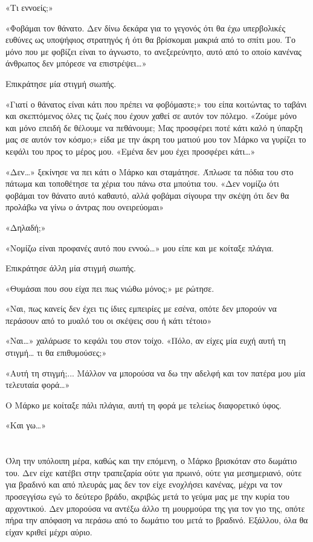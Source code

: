 \documentclass[12pt,twoside, openany]{book}
\begin{document}
«Τι εννοείς;»

«Φοβάμαι τον θάνατο. Δεν δίνω δεκάρα για το γεγονός ότι θα έχω υπερβολικές ευθύνες ως υποψήφιος στρατηγός ή ότι θα βρίσκομαι μακριά από το σπίτι μου. Το μόνο που με φοβίζει είναι το άγνωστο, το ανεξερεύνητο, αυτό από το οποίο κανένας άνθρωπος δεν μπόρεσε να επιστρέψει…»

Επικράτησε μία στιγμή σιωπής.

«Γιατί ο θάνατος είναι κάτι που πρέπει να φοβόμαστε;» του είπα κοιτώντας το ταβάνι και σκεπτόμενος όλες τις ζωές που έχουν χαθεί σε αυτόν τον πόλεμο. «Ζούμε μόνο και μόνο επειδή δε θέλουμε να πεθάνουμε; Μας προσφέρει ποτέ κάτι καλό η ύπαρξη μας σε αυτόν τον κόσμο;» είδα με την άκρη του ματιού μου τον Μάρκο να γυρίζει το κεφάλι του προς το μέρος μου. «Εμένα δεν μου έχει προσφέρει κάτι…»

«Δεν…» ξεκίνησε να πει κάτι ο Μάρκο και σταμάτησε. Άπλωσε τα πόδια του στο πάτωμα και τοποθέτησε τα χέρια του πάνω στα μπούτια του. «Δεν νομίζω ότι φοβάμαι τον θάνατο αυτό καθαυτό, αλλά φοβάμαι σίγουρα την σκέψη ότι δεν θα προλάβω να γίνω ο άντρας που ονειρεύομαι»

«Δηλαδή;»

«Νομίζω είναι προφανές αυτό που εννοώ…» μου είπε και με κοίταξε πλάγια.

Επικράτησε άλλη μία στιγμή σιωπής.

«Θυμάσαι που σου είχα πει πως νιώθω μόνος;» με ρώτησε.

«Ναι, πως κανείς δεν έχει τις ίδιες εμπειρίες με εσένα, οπότε δεν μπορούν να περάσουν από το μυαλό του οι σκέψεις σου ή κάτι τέτοιο»

«Ναι…» χαλάρωσε το κεφάλι του στον τοίχο. «Πόλο, αν είχες μία ευχή αυτή τη στιγμή… τι θα επιθυμούσες;»

«Αυτή τη στιγμή;... Μάλλον να μπορούσα να δω την αδελφή και τον πατέρα μου μία τελευταία φορά…»

Ο Μάρκο με κοίταξε πάλι πλάγια, αυτή τη φορά με τελείως διαφορετικό ύφος. 

«Και γω…»


\chapter{}

Όλη την υπόλοιπη μέρα, καθώς και την επόμενη, ο Μάρκο βρισκόταν στο δωμάτιο του. Δεν είχε κατέβει στην τραπεζαρία ούτε για πρωινό, ούτε για μεσημεριανό, ούτε για βραδινό και από πλευράς μας δεν τον είχε ενοχλήσει κανένας, μέχρι να τον προσεγγίσω εγώ το δεύτερο βράδυ, ακριβώς μετά το γεύμα μας με την κυρία του αρχοντικού. Δεν μπορούσα να αντέξω άλλο τη μουρμούρα της για τον γιο της, οπότε πήρα την απόφαση να περάσω από το δωμάτιο του μετά το βραδινό. Εξάλλου, όλα θα είχαν κριθεί μέχρι αύριο.
\end{document}
